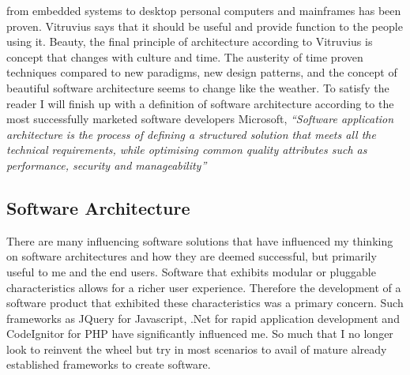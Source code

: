 	from embedded systems to desktop personal computers and mainframes has been proven.  Vitruvius says that it should be useful and provide function to the people 
	using it.
	Beauty, the final principle of architecture according to Vitruvius is concept that changes with culture and time.  The austerity of time proven techniques
	compared to new paradigms, new design patterns, and the concept of beautiful software architecture seems to change like the weather.
	\newline
	\newline
	To satisfy the reader I will finish up with a definition of software architecture according to the most successfully marketed software developers
	Microsoft, \textit{``Software application architecture is the process of defining a structured solution that meets all the technical requirements,
	while optimising common quality attributes such as performance, security and manageability''}

	\subsection{Software Architecture}		
	
	There are many influencing software solutions that have influenced my thinking on software architectures and how they are deemed successful,
	but primarily useful to me and the end users.  Software that exhibits modular or pluggable characteristics allows for a richer user experience.
	Therefore the development of a software product that exhibited these characteristics was a primary concern.  
	Such frameworks as JQuery for Javascript, .Net for rapid application development and CodeIgnitor for PHP have 
	significantly influenced me.  So much that I no longer look to reinvent the wheel but try in most scenarios to avail of mature already 
	established frameworks to create software.
	\newline
	